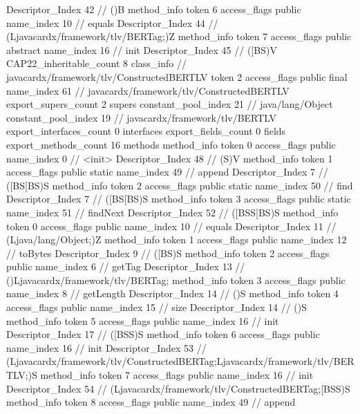 {{{{{					Descriptor_Index	42		// ()B
				}
				method_info {
					token	6
					access_flags	public
					name_index	10		// equals
					Descriptor_Index	44		// (Ljavacardx/framework/tlv/BERTag;)Z
				}
				method_info {
					token	7
					access_flags	public abstract
					name_index	16		// init
					Descriptor_Index	45		// ([BS)V
				}
			}
			CAP22_inheritable_count	8
		}
		class_info {		// javacardx/framework/tlv/ConstructedBERTLV
			token	2
			access_flags	public final
			name_index	61		// javacardx/framework/tlv/ConstructedBERTLV
			export_supers_count	2
			supers {
				constant_pool_index	21		// java/lang/Object
				constant_pool_index	19		// javacardx/framework/tlv/BERTLV
			}
			export_interfaces_count	0
			interfaces {
			}
			export_fields_count	0
			fields {
			}
			export_methods_count	16
			methods {
				method_info {
					token	0
					access_flags	public
					name_index	0		// <init>
					Descriptor_Index	48		// (S)V
				}
				method_info {
					token	1
					access_flags	public static
					name_index	49		// append
					Descriptor_Index	7		// ([BS[BS)S
				}
				method_info {
					token	2
					access_flags	public static
					name_index	50		// find
					Descriptor_Index	7		// ([BS[BS)S
				}
				method_info {
					token	3
					access_flags	public static
					name_index	51		// findNext
					Descriptor_Index	52		// ([BSS[BS)S
				}
				method_info {
					token	0
					access_flags	public
					name_index	10		// equals
					Descriptor_Index	11		// (Ljava/lang/Object;)Z
				}
				method_info {
					token	1
					access_flags	public
					name_index	12		// toBytes
					Descriptor_Index	9		// ([BS)S
				}
				method_info {
					token	2
					access_flags	public
					name_index	6		// getTag
					Descriptor_Index	13		// ()Ljavacardx/framework/tlv/BERTag;
				}
				method_info {
					token	3
					access_flags	public
					name_index	8		// getLength
					Descriptor_Index	14		// ()S
				}
				method_info {
					token	4
					access_flags	public
					name_index	15		// size
					Descriptor_Index	14		// ()S
				}
				method_info {
					token	5
					access_flags	public
					name_index	16		// init
					Descriptor_Index	17		// ([BSS)S
				}
				method_info {
					token	6
					access_flags	public
					name_index	16		// init
					Descriptor_Index	53		// (Ljavacardx/framework/tlv/ConstructedBERTag;Ljavacardx/framework/tlv/BERTLV;)S
				}
				method_info {
					token	7
					access_flags	public
					name_index	16		// init
					Descriptor_Index	54		// (Ljavacardx/framework/tlv/ConstructedBERTag;[BSS)S
				}
				method_info {
					token	8
					access_flags	public
					name_index	49		// append
}}}}}
